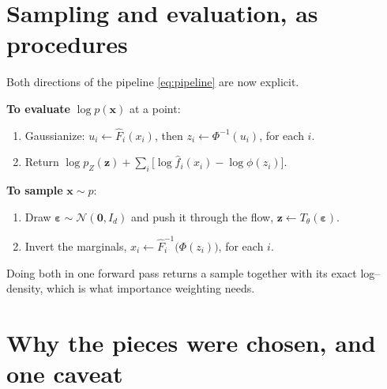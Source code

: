 \documentclass[11pt]{article}
\newcommand{\Ncal}{\mathcal{N}}
\newcommand{\x}{\bm{x}}
\newcommand{\z}{\bm{z}}
\newcommand{\eps}{\bm{\varepsilon}}
\newcommand{\Fhat}{\widehat{F}}
\newcommand{\fhat}{\widehat{f}}
\theoremstyle{remark}
\begin{document}
\section{Sampling and evaluation, as procedures}
\label{sec:algorithms}

Both directions of the pipeline \eqref{eq:pipeline} are now explicit.

\medskip
\noindent\textbf{To evaluate} $\log p(\x)$ at a point:
\begin{enumerate}\itemsep2pt
\item Gaussianize: $u_i\leftarrow\Fhat_i(x_i)$, then $z_i\leftarrow\Phi^{-1}(u_i)$, for each $i$.
\item Return $\log p_Z(\z)+\sum_i\bigl[\log\fhat_i(x_i)-\log\phi(z_i)\bigr]$.
\end{enumerate}

\noindent\textbf{To sample} $\x\sim p$:
\begin{enumerate}\itemsep2pt
\item Draw $\eps\sim\Ncal(\bm0,I_d)$ and push it through the flow, $\z\leftarrow T_\theta(\eps)$.
\item Invert the marginals, $x_i\leftarrow\Fhat_i^{-1}\bigl(\Phi(z_i)\bigr)$, for each $i$.
\end{enumerate}
Doing both in one forward pass returns a sample together with its exact
log--density, which is what importance weighting needs.

\section{Why the pieces were chosen, and one caveat}
\label{sec:why}
\end{document}
